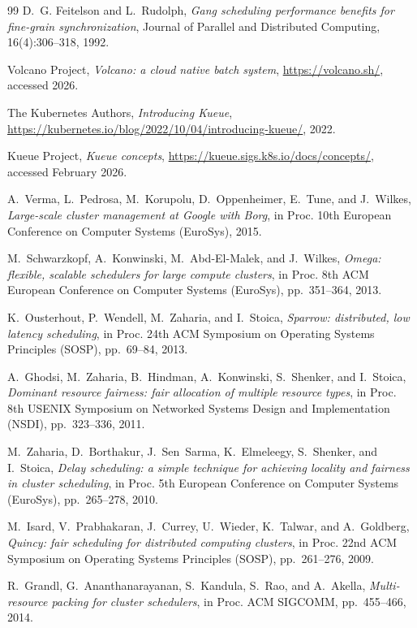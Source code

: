 \documentclass[12pt,a4paper]{report}
\begin{document}
\begin{thebibliography}{99}
D.~G. Feitelson and L.~Rudolph, \emph{Gang scheduling performance benefits
for fine-grain synchronization}, Journal of Parallel and Distributed
Computing, 16(4):306--318, 1992.

Volcano Project, \emph{Volcano: a cloud native batch system},
\url{https://volcano.sh/}, accessed 2026.

The Kubernetes Authors, \emph{Introducing Kueue},
\url{https://kubernetes.io/blog/2022/10/04/introducing-kueue/}, 2022.

Kueue Project, \emph{Kueue concepts},
\url{https://kueue.sigs.k8s.io/docs/concepts/}, accessed February 2026.

A.~Verma, L.~Pedrosa, M.~Korupolu, D.~Oppenheimer, E.~Tune, and J.~Wilkes,
\emph{Large-scale cluster management at Google with Borg}, in Proc. 10th
European Conference on Computer Systems (EuroSys), 2015.

M.~Schwarzkopf, A.~Konwinski, M.~Abd-El-Malek, and J.~Wilkes,
\emph{Omega: flexible, scalable schedulers for large compute clusters},
in Proc. 8th ACM European Conference on Computer Systems (EuroSys),
pp.~351--364, 2013.

K.~Ousterhout, P.~Wendell, M.~Zaharia, and I.~Stoica, \emph{Sparrow:
distributed, low latency scheduling}, in Proc. 24th ACM Symposium on
Operating Systems Principles (SOSP), pp.~69--84, 2013.

A.~Ghodsi, M.~Zaharia, B.~Hindman, A.~Konwinski, S.~Shenker, and
I.~Stoica, \emph{Dominant resource fairness: fair allocation of multiple
resource types}, in Proc. 8th USENIX Symposium on Networked Systems
Design and Implementation (NSDI), pp.~323--336, 2011.

M.~Zaharia, D.~Borthakur, J.~Sen~Sarma, K.~Elmeleegy, S.~Shenker, and
I.~Stoica, \emph{Delay scheduling: a simple technique for achieving
locality and fairness in cluster scheduling}, in Proc. 5th European
Conference on Computer Systems (EuroSys), pp.~265--278, 2010.

M.~Isard, V.~Prabhakaran, J.~Currey, U.~Wieder, K.~Talwar, and
A.~Goldberg, \emph{Quincy: fair scheduling for distributed computing
clusters}, in Proc. 22nd ACM Symposium on Operating Systems Principles
(SOSP), pp.~261--276, 2009.

R.~Grandl, G.~Ananthanarayanan, S.~Kandula, S.~Rao, and A.~Akella,
\emph{Multi-resource packing for cluster schedulers}, in Proc. ACM
SIGCOMM, pp.~455--466, 2014.


\end{thebibliography}
\end{document}
